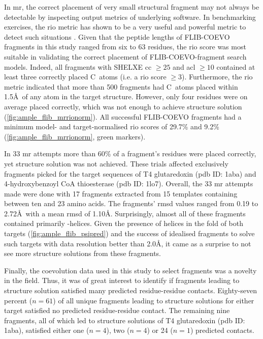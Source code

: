 In \gls{mr}, the correct placement of very small structural fragment may not always be detectable by inspecting output metrics of underlying software. In benchmarking exercises, the \gls{rio} metric has shown to be a very useful and powerful metric to detect such situations \cite{Thomas2015-wu,Thomas2017-sh}. Given that the peptide lengths of FLIB-COEVO fragments in this study ranged from six to 63 residues, the \gls{rio} score was most suitable in validating the correct placement of FLIB-COEVO-fragment search models. Indeed, all fragments with SHELXE \gls{cc} $\geq25$ and \gls{acl} $\geq10$ contained at least three correctly placed C\textalpha\ atoms (i.e. a \gls{rio} score $\geq3$). Furthermore, the \gls{rio} metric indicated that more than 500 fragments had C\textalpha\ atoms placed within 1.5\AA\ of any atom in the target structure. However, only four residues were on average placed correctly, which was not enough to achieve structure solution (\cref{fig:ample_flib_mrrionorm}). All successful FLIB-COEVO fragments had a minimum model- and target-normalised \gls{rio} scores of 29.7\% and 9.2\% (\cref{fig:ample_flib_mrrionorm}, green markers). 

In 33 \gls{mr} attempts more than 60\% of a fragment's residues were placed correctly, yet structure solution was not achieved. These trials affected exclusively fragments picked for the target sequences of T4 glutaredoxin (\gls{pdb} ID: 1aba) and 4-hydroxybenzoyl CoA thioesterase (\gls{pdb} ID: 1lo7). Overall, the 33 \gls{mr} attempts made were done with 17 fragments extracted from 15 templates containing between ten and 23 amino acids. The fragments' \gls{rmsd} values ranged from 0.19 to 2.72\AA\ with a mean \gls{rmsd} of 1.10\AA. Surprisingly, almost all of these fragments contained primarily \textalpha-helices. Given the presence of helices in the fold of both targets (\cref{fig:ample_flib_psipred}) and the success of idealised fragments to solve such targets with data resolution better than 2.0\AA, it came as a surprise to not see more structure solutions from these fragments.

Finally, the coevolution data used in this study to select fragments was a novelty in the field. Thus, it was of great interest to identify if fragments leading to structure solution satisfied many predicted residue-residue contacts. Eighty-seven percent ($n=61$) of all unique fragments leading to structure solutions for either target satisfied no predicted residue-residue contact. The remaining nine fragments, all of which led to structure solutions of T4 glutaredoxin (\gls{pdb} ID: 1aba), satisfied either one ($n=4$), two ($n=4$) or 24 ($n=1$) predicted contacts. 


